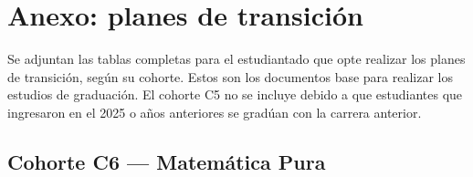 \section{Anexo: planes de transición}
\label{sec:anexo-planes-transicion}

Se adjuntan las tablas completas para el estudiantado que opte realizar los planes de transición, según su cohorte. Estos son los documentos base para realizar los estudios de graduación. El cohorte C5 no se incluye debido a que estudiantes que ingresaron en el 2025 o años anteriores se gradúan con la carrera anterior.

\subsection{Cohorte C6 --- Matemática Pura}
\label{anexo:estudioC6P}

